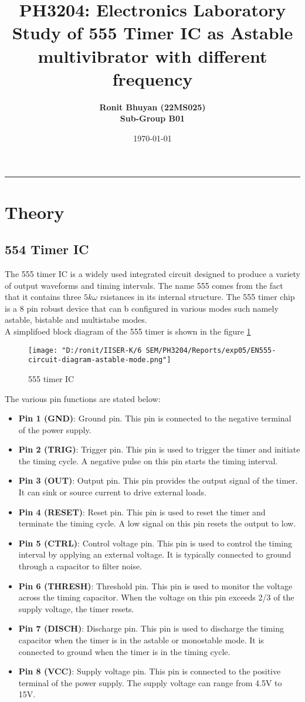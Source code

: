 \documentclass[12pt]{article}
\title{
  \vspace{-2cm}
  \Huge \textbf{PH3204: Electronics Laboratory} \\[0.4cm]
  \Large \textbf{ Study of 555 Timer IC as Astable multivibrator with different frequency}
}
\author{
  \textbf{Ronit Bhuyan (22MS025)} \\[0.2cm]
  \textbf{Sub-Group B01}
}
\date{\today}
\begin{document}
\maketitle

\tableofcontents
\noindent\rule{\textwidth}{0.4pt}
\newpage

\section{Theory}
\subsection{554 Timer IC}
The 555 timer IC is a widely used integrated circuit designed to produce a variety of output waveforms and timing intervals. The name 555 comes from the fact that it contains three $5 k\omega$ rsistances in its internal structure. The 555 timer chip is a 8 pin robust device that can b configured in various modes such namely astable, bistable and multistabe modes. \\
A simplifoed block diagram of the 555 timer is shown in the figure \ref{fig:555_timer}
\begin{figure}[H]
   \centering
    \texttt{[image: "D:/ronit/IISER-K/6 SEM/PH3204/Reports/exp05/EN555-circuit-diagram-astable-mode.png"]}
    \caption{555 timer IC}
    \label{fig:555_timer}
\end{figure}
\noindent
The various pin functions are stated below:
\begin{itemize}
    \item \textbf{Pin 1 (GND)}: Ground pin. This pin is connected to the negative terminal of the power supply.
    \item \textbf{Pin 2 (TRIG)}: Trigger pin. This pin is used to trigger the timer and initiate the timing cycle. A negative pulse on this pin starts the timing interval.
    \item \textbf{Pin 3 (OUT)}: Output pin. This pin provides the output signal of the timer. It can sink or source current to drive external loads.
    \item \textbf{Pin 4 (RESET)}: Reset pin. This pin is used to reset the timer and terminate the timing cycle. A low signal on this pin resets the output to low.
    \item \textbf{Pin 5 (CTRL)}: Control voltage pin. This pin is used to control the timing interval by applying an external voltage. It is typically connected to ground through a capacitor to filter noise.
    \item \textbf{Pin 6 (THRESH)}: Threshold pin. This pin is used to monitor the voltage across the timing capacitor. When the voltage on this pin exceeds 2/3 of the supply voltage, the timer resets.
    \item \textbf{Pin 7 (DISCH)}: Discharge pin. This pin is used to discharge the timing capacitor when the timer is in the astable or monostable mode. It is connected to ground when the timer is in the timing cycle.   
    \item \textbf{Pin 8 (VCC)}: Supply voltage pin. This pin is connected to the positive terminal of the power supply. The supply voltage can range from 4.5V to 15V.
\end{itemize} 
\end{document}
